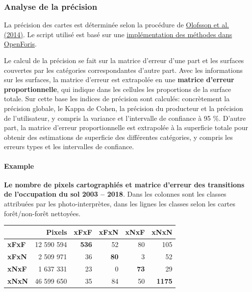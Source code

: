 \documentclass[a4paper, notitlepage, 12pt, krantz2]{krantz}
\let\oldparagraph\paragraph
\renewcommand{\paragraph}[1]{\oldparagraph{#1}\mbox{}}
\begin{document}
\hypertarget{FCC-map-precision}{%
\subsubsection{Analyse de la précision}\label{FCC-map-precision}}

La précision des cartes est déterminée selon la procédure de \href{https://www.sciencedirect.com/science/article/abs/pii/S0034425714000704}{Olofsson et al. (2014)}. Le script utilisé est basé sur une \href{https://github.com/openforis/accuracy-assessment/blob/master/Rscripts/error_matrix_analysis.R}{implémentation des méthodes dans OpenForis}.

Le calcul de la précision se fait sur la matrice d'erreur d'une part et les surfaces couvertes par les catégories correspondantes d'autre part. Avec les informations sur les surfaces, la matrice d'erreur est extrapolée en une \textbf{matrice d'erreur proportionnelle}, qui indique dans les cellules les proportions de la surface totale. Sur cette base les indices de précision sont calculés: concrètement la précision globale, le Kappa de Cohen, la précision du producteur et la précision de l'utilisateur, y compris la variance et l'intervalle de confiance à 95 \%. D'autre part, la matrice d'erreur proportionnelle est extrapolée à la superficie totale pour obtenir des estimations de superficie des différentes catégories, y compris les erreurs types et les intervalles de confiance.

\hypertarget{example-5}{%
\paragraph{Example}\label{example-5}}

\textbf{Le nombre de pixels cartographiés et matrice d'erreur des transitions de l'occupation du sol 2003 -- 2018}. Dans les colonnes sont les classes attribuées par les photo-interprètes, dans les lignes les classes selon les cartes forêt/non-forêt nettoyées.

\begin{longtable}[]{@{}lrrrrr@{}}
\toprule
& Pixels & xFxF & xFxN & xNxF & xNxN\tabularnewline
\midrule
\endhead
\textbf{xFxF} & 12 590 594 & \textbf{536} & 52 & 80 & 105\tabularnewline
\textbf{xFxN} & 2 509 971 & 36 & \textbf{80} & 3 & 52\tabularnewline
\textbf{xNxF} & 1 637 331 & 23 & 0 & \textbf{73} & 29\tabularnewline
\textbf{xNxN} & 46 599 650 & 35 & 84 & 50 & \textbf{1175}\tabularnewline
\bottomrule
\end{longtable}
\end{document}
